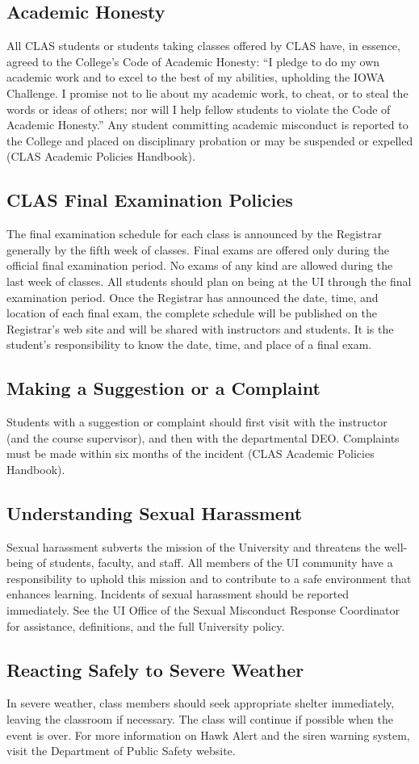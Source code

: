 \documentclass[10pt]{article}
\begin{document}
\subsection*{Academic Honesty}
All CLAS students or students taking classes offered by CLAS have, in essence,
agreed to the College's Code of Academic Honesty: ``I pledge to do my own
academic work and to excel to the best of my abilities, upholding the IOWA
Challenge. I promise not to lie about my academic work, to cheat, or to steal
the words or ideas of others; nor will I help fellow students to violate the
Code of Academic Honesty.'' Any student committing academic misconduct is
reported to the College and placed on disciplinary probation or may be
suspended or expelled (CLAS Academic Policies Handbook).

\subsection*{CLAS Final Examination Policies}
The final examination schedule for each class is announced by the Registrar
generally by the fifth week of classes. Final exams are offered only during the
official final examination period. No exams of any kind are allowed during the
last week of classes. All students should plan on being at the UI through the
final examination period. Once the Registrar has announced the date, time, and
location of each final exam, the complete schedule will be published on the
Registrar's web site and will be shared with instructors and students. It is
the student's responsibility to know the date, time, and place of a final exam.

\subsection*{Making a Suggestion or a Complaint}
Students with a suggestion or complaint should first visit with the instructor
(and the course supervisor), and then with the departmental DEO. Complaints
must be made within six months of the incident (CLAS Academic Policies
Handbook).

\subsection*{Understanding Sexual Harassment}
Sexual harassment subverts the mission of the University and threatens the
well-being of students, faculty, and staff. All members of the UI community
have a responsibility to uphold this mission and to contribute to a safe
environment that enhances learning. Incidents of sexual harassment should be
reported immediately. See the UI Office of the Sexual Misconduct Response
Coordinator for assistance, definitions, and the full University policy.

\subsection*{Reacting Safely to Severe Weather}
In severe weather, class members should seek appropriate shelter immediately,
leaving the classroom if necessary. The class will continue if possible when
the event is over. For more information on Hawk Alert and the siren warning
system, visit the Department of Public Safety website.
\end{document}
